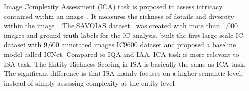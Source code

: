 Image Complexity Assessment (ICA) task is proposed to assess intricacy contained within an image~\cite{visc2009}.
It measures the richness of details and diversity within the image~\cite{Snodgrass1980ASS}.
The SAVOIAS dataset~\cite{saraee2020visual} was created with more than 1,000 images and ground truth labels for the IC analysis.
\citet{ic9600} built the first large-scale IC dataset with 9,600 annotated images IC9600 dataset and proposed a baseline model called ICNet.
Compared to IQA and IAA, ICA task is more relevant to ISA task. 
The Entity Richness Scoring in ISA is basically the same as ICA task. 
The significant difference is that ISA mainly focuses on a higher semantic level, instead of simply assessing complexity at the entity level.
